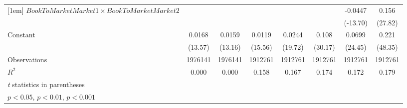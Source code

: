 {\begin{tabular}{l*{7}{c}}
[1em]
$ BookToMarketMarket1 \times BookToMarketMarket2 $&                     &                     &                     &                     &                     &     -0.0447\sym{***}&       0.156\sym{***}\\
                    &                     &                     &                     &                     &                     &    (-13.70)         &     (27.82)         \\
[1em]
Constant            &      0.0168\sym{***}&      0.0159\sym{***}&      0.0119\sym{***}&      0.0244\sym{***}&       0.108\sym{***}&      0.0699\sym{***}&       0.221\sym{***}\\
                    &     (13.57)         &     (13.16)         &     (15.56)         &     (19.72)         &     (30.17)         &     (24.45)         &     (48.35)         \\
\hline
Observations        &     1976141         &     1976141         &     1912761         &     1912761         &     1912761         &     1912761         &     1912761         \\
\(R^{2}\)           &       0.000         &       0.000         &       0.158         &       0.167         &       0.174         &       0.172         &       0.179         \\
\hline\hline
\multicolumn{8}{l}{\footnotesize \textit{t} statistics in parentheses}\\
\multicolumn{8}{l}{\footnotesize \sym{*} \(p<0.05\), \sym{**} \(p<0.01\), \sym{***} \(p<0.001\)}\\
\end{tabular}
}
